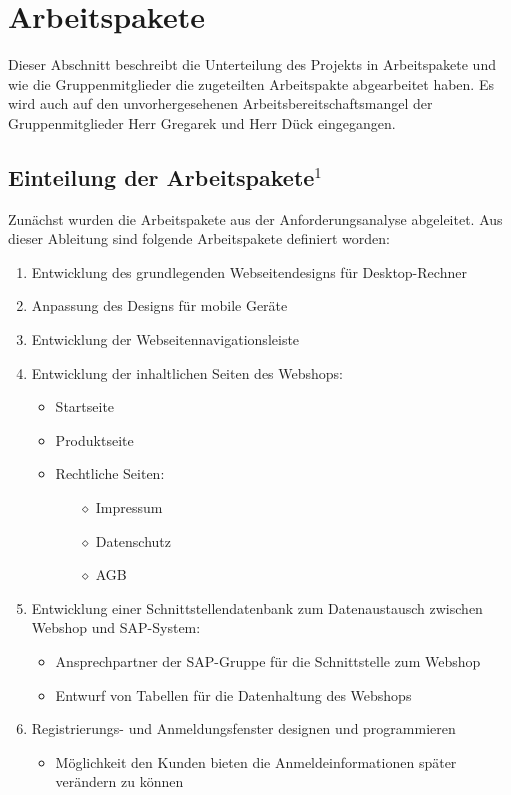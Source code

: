 \newpage
\section{Arbeitspakete}
Dieser Abschnitt beschreibt die Unterteilung des Projekts in Arbeitspakete und wie die Gruppenmitglieder die zugeteilten Arbeitspakte abgearbeitet haben. Es wird auch auf den unvorhergesehenen Arbeitsbereitschaftsmangel der Gruppenmitglieder Herr Gregarek und Herr Dück eingegangen.

\subsection{Einteilung der Arbeitspakete$^1$}
Zunächst wurden die Arbeitspakete aus der Anforderungsanalyse abgeleitet. Aus dieser Ableitung sind folgende Arbeitspakete definiert worden:
\begin{enumerate}
	\item Entwicklung des grundlegenden Webseitendesigns für Desktop-Rechner
	\item Anpassung des Designs für mobile Geräte
	\item Entwicklung der Webseitennavigationsleiste
	\item Entwicklung der inhaltlichen Seiten des Webshops:
	\begin{itemize}
		\item Startseite
		\item Produktseite
		\item Rechtliche Seiten:
		\begin{itemize}
			\item[$\diamond$] Impressum
			\item[$\diamond$] Datenschutz
			\item[$\diamond$] AGB
		\end{itemize}
	\end{itemize}
	\item Entwicklung einer Schnittstellendatenbank zum Datenaustausch zwischen Webshop und SAP-System:
	\begin{itemize}
		\item Ansprechpartner der SAP-Gruppe für die Schnittstelle zum Webshop
		\item Entwurf von Tabellen für die Datenhaltung des Webshops 
	\end{itemize}
	\item Registrierungs- und Anmeldungsfenster designen und programmieren
	\begin{itemize}
		\item Möglichkeit den Kunden bieten die Anmeldeinformationen später verändern zu können

\end{itemize}
\end{enumerate}
